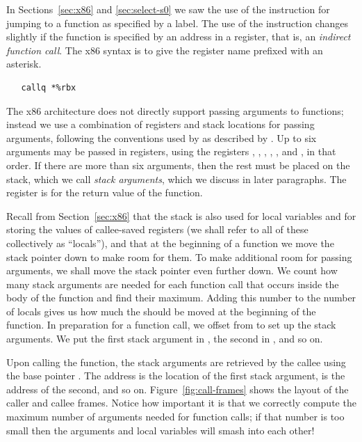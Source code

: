 \documentclass[11pt]{book}
\begin{document}
In Sections~\ref{sec:x86} and \ref{sec:select-s0} we saw the use of
the  instruction for jumping to a function as specified by
a label. The use of the instruction changes slightly if the function
is specified by an address in a register, that is, an \emph{indirect
  function call}. The x86 syntax is to give the register name prefixed
with an asterisk.
\begin{lstlisting}
   callq *%rbx
\end{lstlisting}

The x86 architecture does not directly support passing arguments to
functions; instead we use a combination of registers and stack
locations for passing arguments, following the conventions used by
 as described by \cite{Matz:2013aa}. Up to six arguments may
be passed in registers, using the registers , ,
, , , and , in that order.  If
there are more than six arguments, then the rest must be placed on the
stack, which we call \emph{stack arguments}, which we discuss in later
paragraphs. The register  is for the return value of the
function.

Recall from Section~\ref{sec:x86} that the stack is also used for
local variables and for storing the values of callee-saved registers
(we shall refer to all of these collectively as ``locals''), and that
at the beginning of a function we move the stack pointer 
down to make room for them.
To make additional room for passing arguments, we shall
move the stack pointer even further down. We count how many stack
arguments are needed for each function call that occurs inside the
body of the function and find their maximum. Adding this number to the
number of locals gives us how much the  should be moved at
the beginning of the function. In preparation for a function call, we
offset from  to set up the stack arguments. We put the first
stack argument in , the second in , and
so on.

Upon calling the function, the stack arguments are retrieved by the
callee using the base pointer . The address 
is the location of the first stack argument,  is the
address of the second, and so on. Figure~\ref{fig:call-frames} shows
the layout of the caller and callee frames. Notice how important it is
that we correctly compute the maximum number of arguments needed for
function calls; if that number is too small then the arguments and
local variables will smash into each other!
\end{document}

